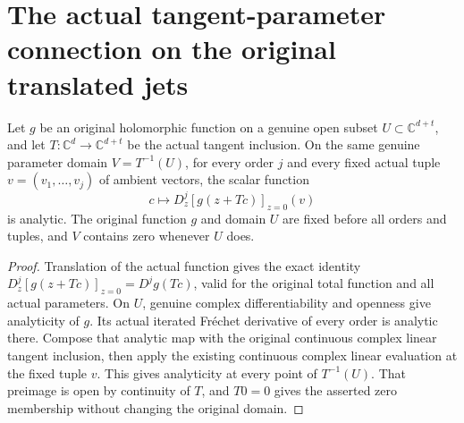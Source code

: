 \section{The actual tangent-parameter connection on the original translated jets}

\begin{theorem}
\label{hir:actual-tangent-parameter-all-order-jet-analyticity}
\leanok
Let $g$ be an original holomorphic function on a genuine open subset
$U\subset\mathbb C^{d+t}$, and let $T:\mathbb C^d\to\mathbb C^{d+t}$
be the actual tangent inclusion. On the same genuine parameter domain
$V=T^{-1}(U)$, for every order $j$ and every fixed actual tuple
$v=(v_1,\ldots,v_j)$ of ambient vectors, the scalar function
\[
 c\longmapsto D_z^j[g(z+Tc)]_{z=0}(v)
\]
is analytic. The original function $g$ and domain $U$ are fixed before
all orders and tuples, and $V$ contains zero whenever $U$ does.
\end{theorem}
\begin{proof}
Translation of the actual function gives the exact identity
$D_z^j[g(z+Tc)]_{z=0}=D^jg(Tc)$, valid for the original total function
and all actual parameters. On $U$, genuine complex differentiability
and openness give analyticity of $g$. Its actual iterated Fr\'echet
derivative of every order is analytic there. Compose that analytic
map with the original continuous complex linear tangent inclusion,
then apply the existing continuous complex linear evaluation at the
fixed tuple $v$. This gives analyticity at every point of $T^{-1}(U)$.
That preimage is open by continuity of $T$, and $T0=0$ gives the
asserted zero membership without changing the original domain.
\end{proof}

